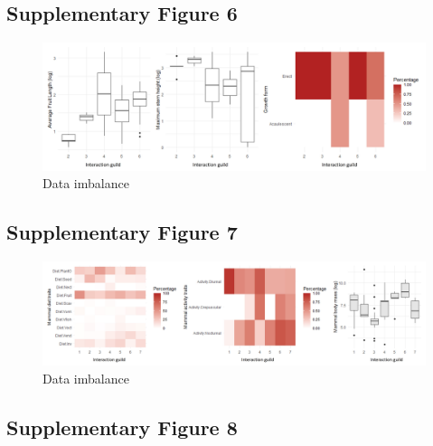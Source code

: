 \documentclass[
]{agujournal2019}
\begin{document}
\subsection{Supplementary Figure 6}

\begin{figure}[H]

{\centering \includegraphics[width=5.67708in,height=\textheight,keepaspectratio]{sup_figures/palm_trait_sbm.jpg}

}

\caption{Data imbalance}

\end{figure}%

\subsection{Supplementary Figure 7}

\begin{figure}[H]

{\centering \includegraphics[width=5.67708in,height=\textheight,keepaspectratio]{sup_figures/mammal_trait_sbm.jpg}

}

\caption{Data imbalance}

\end{figure}%

\subsection{Supplementary Figure 8}
\end{document}
